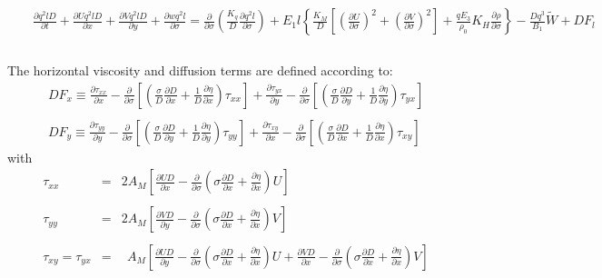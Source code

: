 \documentclass[oribibl]{llncs}
\begin{document}
\begin{eqnarray}
\\   
&&\frac{\partial q^2 l D}{\partial t} + \frac{\partial U q^2 l D}{\partial x} +\frac{\partial V q^2 l D}{\partial y} + \frac{\partial w q^2 l}{\partial \sigma}   = \frac{\partial}{\partial \sigma} \left( \frac{K_q}{D} \frac{\partial q^2 l}{\partial \sigma} \right)+ E_1  l \left\{ \frac{K_M}{D}\left[ \left( \frac{\partial U}{\partial \sigma}\right)^2 + \left( \frac{\partial V}{\partial \sigma}\right)^2 \right] + \frac{q E_3}{\rho_0}K_H\frac{\partial \rho}{\partial \sigma} \right\} - \frac{D q^3}{B_1} \widetilde{W} + D F_l    \label{eq:final7}\nonumber \\ 
\nonumber  \\ 
\end{eqnarray}

The horizontal viscosity and diffusion terms are defined according to:
\begin{eqnarray}
DF_x \equiv \frac{\partial \tau_{xx}}{\partial x} -\frac{\partial}{\partial \sigma} \left[ \left(  \frac{\sigma}{D} \frac{\partial D}{\partial x} + \frac{1}{D} \frac{\partial \eta}{\partial x} \right) \tau_{xx}  \right] +  \frac{\partial \tau_{yx}}{\partial y} -\frac{\partial}{\partial \sigma} \left[ \left(  \frac{\sigma}{D} \frac{\partial D}{\partial y} + \frac{1}{D} \frac{\partial \eta}{\partial y} \right) \tau_{yx}  \right]   \\ 
\nonumber \\ 
DF_y \equiv \frac{\partial \tau_{yy}}{\partial y} -\frac{\partial}{\partial \sigma} \left[ \left(  \frac{\sigma}{D} \frac{\partial D}{\partial y} + \frac{1}{D} \frac{\partial \eta}{\partial y} \right) \tau_{yy}  \right] +  \frac{\partial \tau_{xy}}{\partial x} -\frac{\partial}{\partial \sigma} \left[ \left(  \frac{\sigma}{D} \frac{\partial D}{\partial x} + \frac{1}{D} \frac{\partial \eta}{\partial x} \right) \tau_{xy}  \right]   
\end{eqnarray}
with
\begin{eqnarray}
\tau_{xx} &=& 2 A_M \left[ \frac{\partial UD}{\partial x} -\frac{\partial}{\partial \sigma} \left( \sigma \frac{\partial D}{\partial x} + \frac{\partial \eta}{\partial x} \right)U \right] \\
\nonumber \\
\tau_{yy} &=& 2 A_M \left[ \frac{\partial VD}{\partial y} -\frac{\partial}{\partial \sigma} \left( \sigma \frac{\partial D}{\partial x} + \frac{\partial \eta}{\partial x} \right)V \right] \\
\nonumber \\
\tau_{xy} = \tau_{yx} &=& \ \ A_M  \left[ \frac{\partial UD}{\partial y} -\frac{\partial}{\partial \sigma} \left( \sigma \frac{\partial D}{\partial x} + \frac{\partial \eta}{\partial x} \right)U +  \frac{\partial VD}{\partial x} -\frac{\partial}{\partial \sigma} \left( \sigma \frac{\partial D}{\partial x} + \frac{\partial \eta}{\partial x} \right)V \right]
\end{eqnarray}
\end{document}
